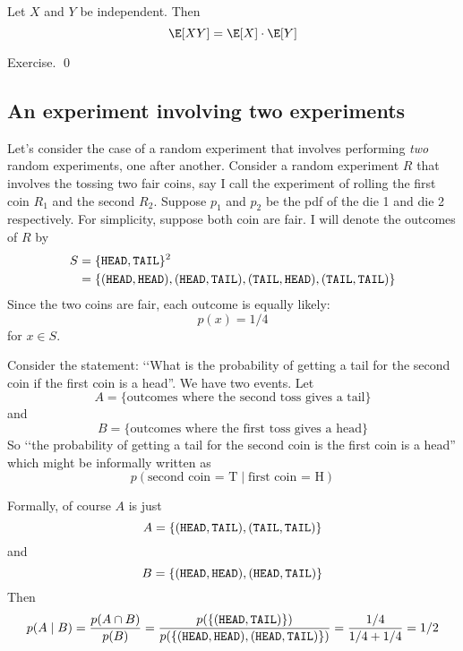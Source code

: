 

\begin{thm}
  Let $X$ and $Y$ be independent.
  Then
  \[
  \E[XY] = \E[X] \cdot \E[Y]
  \]
\end{thm}


\proof
Exercise.
\qed



\subsection{An experiment involving two experiments}

Let's consider the case of a random experiment that involves
performing \textit{two} random experiments, one after another.
Consider a random experiment $R$
that involves the tossing two fair coins, say I call the experiment of
rolling the first coin $R_1$ and the second $R_2$.
Suppose $p_1$ and $p_2$ be the pdf of the die 1 and die 2 respectively.
For simplicity, suppose both coin are fair.
I will denote the outcomes of $R$ by
\begin{align*}
S
&= \{\texttt{HEAD}, \texttt{TAIL}\}^2 \\
&= \{ (\texttt{HEAD},\texttt{HEAD}), (\texttt{HEAD},\texttt{TAIL}), (\texttt{TAIL},\texttt{HEAD}), (\texttt{TAIL}, \texttt{TAIL}) \}
\end{align*}
Since the two coins are fair, each outcome is equally likely:
\[
p(x) = 1/4
\]
for $x \in S$.

Consider the statement: \lq\lq What is the probability of
getting a tail for the second coin if the first coin is a head''.
We have two events.
Let
\[
A = \{\text{outcomes where the second toss gives a tail}\}
\]
and
\[
B = \{\text{outcomes where the first toss gives a head}\}
\]
So 
\lq\lq the probability of
getting a tail for the second coin is the first coin is a head''
which might be informally written as
\[
p(\text{second coin = T} \mid \text{first coin = H})
\]

Formally, of course $A$ is just
\[
A = \{(\texttt{HEAD},\texttt{TAIL}), (\texttt{TAIL}, \texttt{TAIL})\}
\]
and
\[
B = \{(\texttt{HEAD},\texttt{HEAD}), (\texttt{HEAD},\texttt{TAIL})\}
\]
Then
\[
p(A \mid B)
= \frac{p(A \cap B)}{p(B)}
= \frac{p(\{ (\texttt{HEAD}, \texttt{TAIL}) \})}{p(\{(\texttt{HEAD},\texttt{HEAD}), (\texttt{HEAD},\texttt{TAIL})\})}
= \frac{1/4}{1/4 + 1/4} = 1/2
\]

